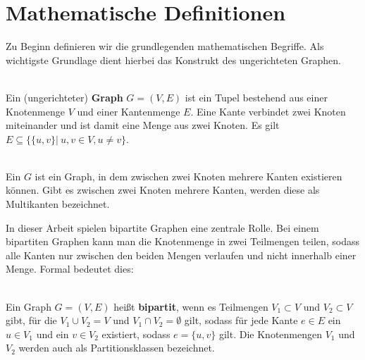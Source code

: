 



\section{Mathematische Definitionen}
Zu Beginn definieren wir die grundlegenden mathematischen Begriffe. Als wichtigste Grundlage dient 
hierbei das Konstrukt des ungerichteten Graphen.
\begin{definition}[Graph] ~\\
Ein (ungerichteter) \textbf{Graph} $G = (V,E)$ ist ein Tupel bestehend aus einer Knotenmenge $V$ und einer Kantenmenge
 $E$. Eine Kante verbindet zwei Knoten miteinander und ist damit eine Menge aus zwei Knoten.
 Es gilt $E \subseteq \{ \{u,v\} |\ u,v \in V, u \neq v \}$.  
\end{definition}
\begin{definition}[Multigraph] ~\\
Ein  $G$ ist ein Graph, in dem zwischen zwei Knoten mehrere Kanten existieren 
können. Gibt es zwischen zwei Knoten mehrere Kanten, werden diese als Multikanten bezeichnet.
\end{definition}

In dieser Arbeit spielen bipartite Graphen eine zentrale Rolle.
Bei einem bipartiten Graphen kann man die Knotenmenge in zwei Teilmengen teilen, sodass alle Kanten nur zwischen den 
beiden Mengen verlaufen und nicht innerhalb einer Menge. Formal bedeutet dies:
\begin{definition} ~\\
Ein Graph $G=(V,E)$ heißt \textbf{bipartit}, wenn es Teilmengen $V_1 \subset V$ und $V_2 \subset V$ gibt, für die 
$V_1 \cup V_2 = V$ und $V_1 \cap V_2 = \emptyset$ gilt,
 sodass für jede Kante $e \in E$ ein $u \in V_1$ und ein $v \in V_2$ existiert, sodass $e = \{u,v\}$ gilt.
Die Knotenmengen $V_1$ und $V_2$ werden auch als Partitionsklassen bezeichnet.
\end{definition}

